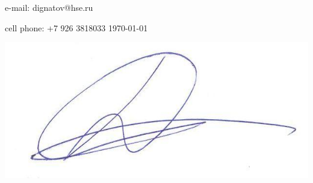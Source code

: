 \documentclass[14pt]{letter}
\begin{document}
e-mail: dignatov@hse.ru \par
cell phone: +7 926 3818033
\hfill\today

\hfill 
\includegraphics[scale=0.45]{ignatov_sign.jpg}
\end{document}
